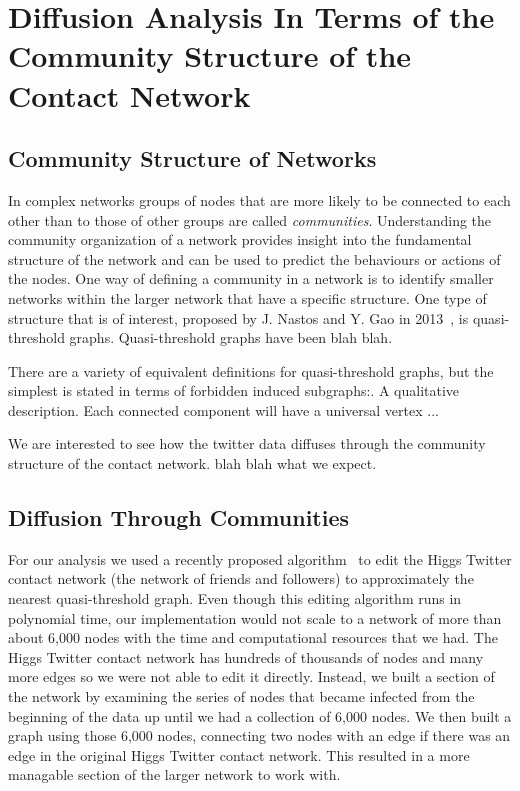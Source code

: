\documentclass[12pt, oneside, openany]{article} %
\begin{document}
\section{Diffusion Analysis In Terms of the Community Structure of the Contact Network}
\subsection{Community Structure of Networks}
In complex networks groups of nodes that are more likely to be connected to each other than to those of other groups are called \emph{communities}. Understanding the community organization of a network provides insight into the fundamental structure of the network and can be used to predict the behaviours or actions of the nodes. One way of defining a community in a network is to identify smaller networks within the larger network that have a specific structure. One type of structure that is of interest, proposed by J. Nastos and Y. Gao in 2013~\cite{nastos:2013}, is quasi-threshold graphs. Quasi-threshold graphs have been blah blah.

There are a variety of equivalent definitions for quasi-threshold graphs, but the simplest is stated in terms of forbidden induced subgraphs:. A qualitative description. Each connected component will have a universal vertex ... 

We are interested to see how the twitter data diffuses through the community structure of the contact network. blah blah what we expect.

\subsection{Diffusion Through Communities}
For our analysis we used a recently proposed algorithm~\cite{brandes} to edit the Higgs Twitter contact network (the network of friends and followers) to approximately the nearest quasi-threshold graph. Even though this editing algorithm runs in polynomial time, our implementation would not scale to a network of more than about 6,000 nodes with the time and computational resources that we had. The Higgs Twitter contact network has hundreds of thousands of nodes and many more edges so we were not able to edit it directly. Instead, we built a section of the network by examining the series of nodes that became infected from the beginning of the data up until we had a collection of 6,000 nodes. We then built a graph using those 6,000 nodes, connecting two nodes with an edge if there was an edge in the original Higgs Twitter contact network. This resulted in a more managable section of the larger network to work with.
\end{document}

